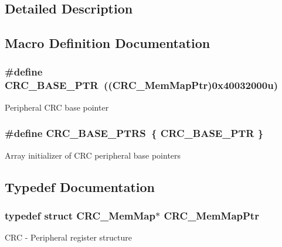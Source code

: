 \subsection{Detailed Description}


\subsection{Macro Definition Documentation}
\hypertarget{group___c_r_c___peripheral_ga139bd4056b9e3c7987d28b6e955b662d}{}
\subsubsection[{C\+R\+C\+\_\+\+B\+A\+S\+E\+\_\+\+P\+T\+R}]{\setlength{\rightskip}{0pt plus 5cm}\#define C\+R\+C\+\_\+\+B\+A\+S\+E\+\_\+\+P\+T\+R~(({\bf C\+R\+C\+\_\+\+Mem\+Map\+Ptr})0x40032000u)}\label{group___c_r_c___peripheral_ga139bd4056b9e3c7987d28b6e955b662d}
Peripheral C\+R\+C base pointer \hypertarget{group___c_r_c___peripheral_ga0532d18a8549a09065845e5210ca6876}{}
\subsubsection[{C\+R\+C\+\_\+\+B\+A\+S\+E\+\_\+\+P\+T\+R\+S}]{\setlength{\rightskip}{0pt plus 5cm}\#define C\+R\+C\+\_\+\+B\+A\+S\+E\+\_\+\+P\+T\+R\+S~\{ {\bf C\+R\+C\+\_\+\+B\+A\+S\+E\+\_\+\+P\+T\+R} \}}\label{group___c_r_c___peripheral_ga0532d18a8549a09065845e5210ca6876}
Array initializer of C\+R\+C peripheral base pointers 

\subsection{Typedef Documentation}
\hypertarget{group___c_r_c___peripheral_ga65ec00368ee39504a8a83cd736901b84}{}
\subsubsection[{C\+R\+C\+\_\+\+Mem\+Map\+Ptr}]{\setlength{\rightskip}{0pt plus 5cm}typedef struct {\bf C\+R\+C\+\_\+\+Mem\+Map}$\ast$ {\bf C\+R\+C\+\_\+\+Mem\+Map\+Ptr}}\label{group___c_r_c___peripheral_ga65ec00368ee39504a8a83cd736901b84}
C\+R\+C -\/ Peripheral register structure 